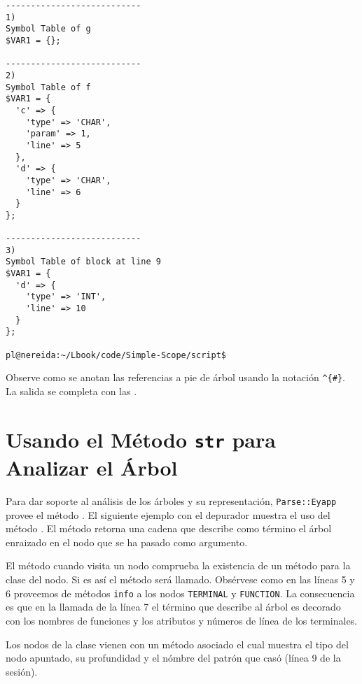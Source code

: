 \begin{verbatim}
---------------------------
1)
Symbol Table of g
$VAR1 = {};

---------------------------
2)
Symbol Table of f
$VAR1 = {
  'c' => {
    'type' => 'CHAR',
    'param' => 1,
    'line' => 5
  },
  'd' => {
    'type' => 'CHAR',
    'line' => 6
  }
};

---------------------------
3)
Symbol Table of block at line 9
$VAR1 = {
  'd' => {
    'type' => 'INT',
    'line' => 10
  }
};

pl@nereida:~/Lbook/code/Simple-Scope/script$ 
\end{verbatim}

Observe como se anotan las referencias a pie de árbol usando la notación
\verb|^{#}|. La salida se completa con las .

\section{Usando el Método {\tt str} para Analizar el Árbol}
\label{section:str}

Para dar soporte al análisis de los árboles y su representación, \verb|Parse::Eyapp|
provee el método . El siguiente ejemplo con el depurador muestra el uso del método
.
El método  retorna
una cadena que describe como término el árbol enraizado en el nodo
que se ha pasado como argumento.


El método  cuando visita un nodo comprueba la existencia de 
un método  para la clase del nodo. Si es así el método
será llamado. Obsérvese como en las líneas 5 y 6 proveemos de métodos
\verb|info| a los nodos \verb|TERMINAL| y \verb|FUNCTION|.
La consecuencia es que en la llamada de la línea 7 el término
que describe al árbol es decorado con los nombres de funciones
y los atributos y números de línea de los terminales.

Los nodos de la clase  vienen con un
método  asociado el cual muestra el tipo del
nodo apuntado, su profundidad y el nómbre del patrón que casó (línea 9
de la sesión).

